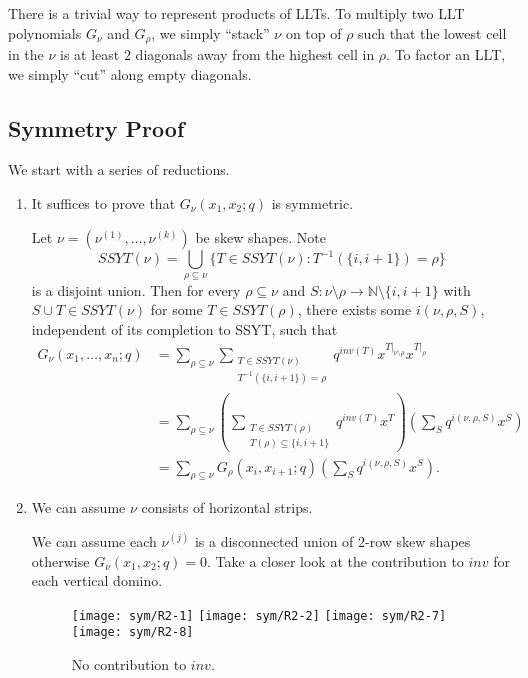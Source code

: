 There is a trivial way to represent products of LLTs. To multiply two
LLT polynomials $G_{\nu}$ and $G_{\rho}$, we simply ``stack'' $\nu$ on top of
$\rho$ such that the lowest cell in the $\nu$ is at least $2$ diagonals
away from the highest cell in $\rho$.  To factor an LLT, we simply
``cut'' along empty diagonals.

\subsection{Symmetry Proof}
\label{sec:symmetry}

We start with a series of reductions.

\begin{enumerate}[label=\textbf{(R\arabic*)}]
\item It suffices to prove that $G_{\nu}(x_{1},x_{2};q)$ is symmetric.

  Let $\nu = (\nu^{(1)}, \dots, \nu^{(k)})$ be skew shapes.  Note
  \[
    SSYT(\nu) = \bigcup_{\rho \subseteq \nu} \bigg\{ T \in SSYT(\nu) : T^{-1}(\{i,i+1\}) = \rho \bigg\}
  \]
  is a disjoint union.  Then for every $\rho \subseteq \nu$ and
  $S: \nu\setminus\rho \to \mathbb{N} \setminus \{i,i+1\}$ with
  $S \cup T \in SSYT(\nu)$ for some $T \in SSYT(\rho)$, there exists some
  $i(\nu,\rho,S)$, independent of its completion to SSYT, such that
  \begin{align*}
    G_{\nu}(x_{1}, \dots, x_{n}; q)
    &= \sum_{\rho \subseteq \nu} \sum_{\substack{T \in SSYT(\nu)\\T^{-1}(\{i,i+1\}) = \rho}}
      q^{inv(T)} x^{T|_{\nu \setminus \rho}} x^{T|_{\rho}} \\
    &= \sum_{\rho \subseteq \nu} \left( \sum_{\substack{T \in SSYT(\rho)\\T(\rho)\subseteq\{i,i+1\}}} q^{inv(T)}
    x^{T}\right) \left( \sum_{S} q^{i(\nu,\rho,S)} x^{S} \right) \\
    &= \sum_{\rho \subseteq \nu} G_{\rho}(x_{i},x_{i+1}; q) \left( \sum_{S} q^{i(\nu,\rho,S)} x^{S} \right).
  \end{align*}

\item We can assume $\nu$ consists of horizontal strips.

  We can assume each $\nu^{(j)}$ is a disconnected union of $2$-row skew
  shapes otherwise $G_{\nu}(x_{1},x_{2}; q) = 0$.  Take a closer look at
  the contribution to $inv$ for each vertical domino.
  \begin{figure}[H]
    \centering
    \texttt{[image: sym/R2-1]}
    \quad
    \texttt{[image: sym/R2-2]}
    \quad
    \texttt{[image: sym/R2-7]}
    \quad
    \texttt{[image: sym/R2-8]}
    \caption{No contribution to $inv$.}
  \end{figure}


\end{enumerate}
